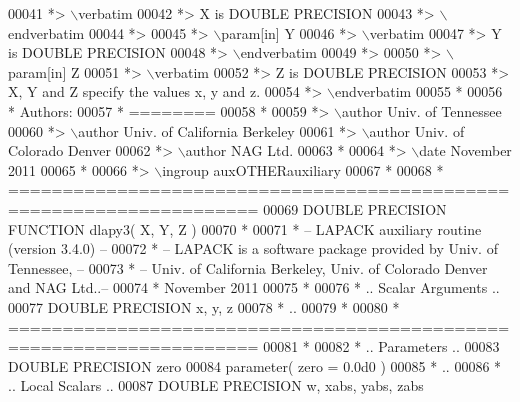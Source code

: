 \begin{DoxyCode}
00041 \textcolor{comment}{*> \(\backslash\)verbatim}
00042 \textcolor{comment}{*>          X is DOUBLE PRECISION}
00043 \textcolor{comment}{*> \(\backslash\)endverbatim}
00044 \textcolor{comment}{*>}
00045 \textcolor{comment}{*> \(\backslash\)param[in] Y}
00046 \textcolor{comment}{*> \(\backslash\)verbatim}
00047 \textcolor{comment}{*>          Y is DOUBLE PRECISION}
00048 \textcolor{comment}{*> \(\backslash\)endverbatim}
00049 \textcolor{comment}{*>}
00050 \textcolor{comment}{*> \(\backslash\)param[in] Z}
00051 \textcolor{comment}{*> \(\backslash\)verbatim}
00052 \textcolor{comment}{*>          Z is DOUBLE PRECISION}
00053 \textcolor{comment}{*>          X, Y and Z specify the values x, y and z.}
00054 \textcolor{comment}{*> \(\backslash\)endverbatim}
00055 \textcolor{comment}{*}
00056 \textcolor{comment}{*  Authors:}
00057 \textcolor{comment}{*  ========}
00058 \textcolor{comment}{*}
00059 \textcolor{comment}{*> \(\backslash\)author Univ. of Tennessee }
00060 \textcolor{comment}{*> \(\backslash\)author Univ. of California Berkeley }
00061 \textcolor{comment}{*> \(\backslash\)author Univ. of Colorado Denver }
00062 \textcolor{comment}{*> \(\backslash\)author NAG Ltd. }
00063 \textcolor{comment}{*}
00064 \textcolor{comment}{*> \(\backslash\)date November 2011}
00065 \textcolor{comment}{*}
00066 \textcolor{comment}{*> \(\backslash\)ingroup auxOTHERauxiliary}
00067 \textcolor{comment}{*}
00068 \textcolor{comment}{*  =====================================================================}
00069 \textcolor{keyword}{      DOUBLE PRECISION }\textcolor{keyword}{FUNCTION }dlapy3( X, Y, Z )
00070 \textcolor{comment}{*}
00071 \textcolor{comment}{*  -- LAPACK auxiliary routine (version 3.4.0) --}
00072 \textcolor{comment}{*  -- LAPACK is a software package provided by Univ. of Tennessee,    --}
00073 \textcolor{comment}{*  -- Univ. of California Berkeley, Univ. of Colorado Denver and NAG Ltd..--}
00074 \textcolor{comment}{*     November 2011}
00075 \textcolor{comment}{*}
00076 \textcolor{comment}{*     .. Scalar Arguments ..}
00077       \textcolor{keywordtype}{DOUBLE PRECISION}   x, y, z
00078 \textcolor{comment}{*     ..}
00079 \textcolor{comment}{*}
00080 \textcolor{comment}{*  =====================================================================}
00081 \textcolor{comment}{*}
00082 \textcolor{comment}{*     .. Parameters ..}
00083       \textcolor{keywordtype}{DOUBLE PRECISION}   zero
00084       parameter( zero = 0.0d0 )
00085 \textcolor{comment}{*     ..}
00086 \textcolor{comment}{*     .. Local Scalars ..}
00087       \textcolor{keywordtype}{DOUBLE PRECISION}   w, xabs, yabs, zabs

\end{DoxyCode}
